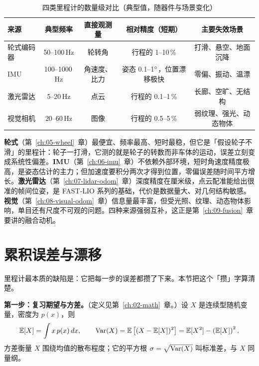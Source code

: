 \begin{table}[htbp]
  \centering
  \caption{四类里程计的数量级对比（典型值，随器件与场景变化）}
  \label{tab:04-sources}
  \small
  \begin{tabular}{lcccc}
    \toprule
    来源 & 典型频率 & 直接观测量 & 相对精度（短期） & 主要失效场景 \\
    \midrule
    轮式编码器 & 50--100\,Hz & 轮转角 & 行程的 1--10\,\% & 打滑、悬空、地面沉降 \\
    IMU & 100--1000\,Hz & 角速度、比力 & 姿态 0.1--1$^\circ$，位置漂移极快 & 零偏、振动、温漂 \\
    激光雷达 & 5--20\,Hz & 点云 & 行程的 0.1--1\,\% & 长廊、空旷、无结构 \\
    视觉相机 & 20--60\,Hz & 图像 & 行程的 0.5--5\,\% & 弱纹理、强光、动态物体 \\
    \bottomrule
  \end{tabular}
\end{table}

\textbf{轮式}（第~\ref{ch:05-wheel}~章）最便宜、频率最高、短时最稳，但它是「假设轮子不滑」的里程计：轮子一打滑，它测的就是轮子的转数而非车体的运动，误差立刻变成系统性偏差。\textbf{IMU}（第~\ref{ch:06-imu}~章）不依赖外部环境，短时角速度精度极高，是姿态估计的主力；但加速度要积分两次才得到位置，零偏误差随时间平方增长。\textbf{激光雷达}（第~\ref{ch:07-lidar-odom}~章）深度精度在厘米级，点云配准能给出很准的帧间位姿，是 FAST-LIO 系列的基础，代价是数据量大、对几何结构敏感。\textbf{视觉}（第~\ref{ch:08-visual-odom}~章）信息量最丰富，但受光照、纹理、动态物体影响，单目还有尺度不可观的问题。四种来源强弱互补，这正是第~\ref{ch:09-fusion}~章要讲的融合动机。

\section{累积误差与漂移}\label{sec:04-drift}

里程计最本质的缺陷是：它把每一步的误差都攒了下来。本节把这个「攒」字算清楚。

\textbf{第一步：复习期望与方差。}（定义见第~\ref{ch:02-math}~章。）设 $X$ 是连续型随机变量，密度为 $p(x)$，则
\begin{equation}
  \mathbb{E}[X] = \int x\,p(x)\,d x,
  \qquad
  \operatorname{Var}(X) = \mathbb{E}\left[(X-\mathbb{E}[X])^{2}\right] = \mathbb{E}[X^{2}] - \left(\mathbb{E}[X]\right)^{2}.
  \label{eq:04-var-def}
\end{equation}
方差衡量 $X$ 围绕均值的散布程度；它的平方根 $\sigma=\sqrt{\operatorname{Var}(X)}$ 叫标准差，与 $X$ 同量纲。

